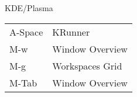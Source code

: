 \begin{conceptbox}[white]{KDE/Plasma}
\begin{tabular}{ll}
A-Space&KRunner\\
M-w&Window Overview\\
M-g&Workspaces Grid\\
M-Tab&Window Overview\\
\end{tabular}
\end{conceptbox}
